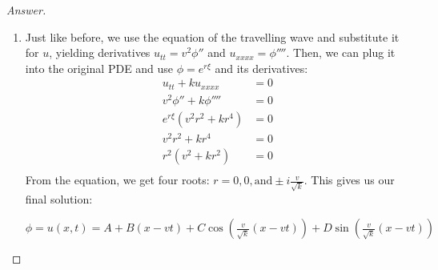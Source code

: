 \documentclass{article}
\theoremstyle{definition}
\renewcommand\qedsymbol{$\blacksquare$}
\newenvironment{ans}{\begin{proof}[Answer]\renewcommand{\qedsymbol}{}}{\end{proof}}
\begin{document}
\begin{ans}
\begin{enumerate}[start=38, resume*=answers]
    \item Just like before, we use the equation of the travelling wave and substitute it for $u$, yielding derivatives $u_{tt} = v^2\phi''$ and $u_{xxxx}=\phi''''$. Then, we can plug it into the original PDE and use $\phi = e^{r\xi}$ and its derivatives:
    \begin{align*}
        u_{tt} + ku_{xxxx} &= 0\\
        v^2\phi'' + k\phi'''' &= 0\\
        e^{r\xi} \left( v^2r^2 + kr^4 \right) &= 0\\
        v^2r^2 + kr^4 &= 0\\
        r^2(v^2 + kr^2) &= 0\\
    \end{align*}
    From the equation, we get four roots: $r = 0, 0, \text{and} \pm i\frac{v}{\sqrt{k}}$. This gives us our final solution:\\
    \begin{center}
    $\boxed{\phi=u(x,t)= A + B(x-vt) + C\cos{(\frac{v}{\sqrt{k}}(x-vt))} + D\sin{(\frac{v}{\sqrt{k}}(x-vt))}}$
    \end{center}
\end{enumerate}
\end{ans}
\end{document}
